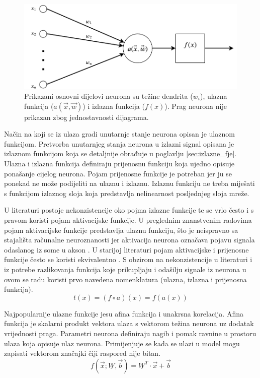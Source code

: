 \documentclass[times, utf8, numeric, diplomski]{fer}
\def\mat#1{\underline{#1}}
\begin{document}
\begin{figure}[h]
\centering
\includegraphics[scale=0.7]{Neuron.pdf}
\caption{Prikazani osnovni dijelovi neurona su težine dendrita ($w_i$), ulazna funkcija ($a(\vec{x},\vec{w})$) i izlazna funkcija ($f(x)$). Prag neurona nije prikazan zbog jednostavnosti dijagrama.}
\label{fig:neuron}
\end{figure}

Način na koji se iz ulaza gradi unutarnje stanje neurona opisan je ulaznom funkcijom. Pretvorba unutarnjeg stanja neurona u izlazni signal opisana je izlaznom funkcijom koja se detaljnije obrađuje u poglavlju \ref{sec:izlazne_fje}. Ulazna i izlazna funkcija definiraju prijenosnu funkciju koja ujedno opisuje ponašanje cijelog neurona. Pojam prijenosne funkcije je potreban jer ju se ponekad ne može podijeliti na ulaznu i izlaznu. Izlaznu funkciju ne treba miješati s funkcijom izlaznog sloja koja predstavlja nelinearnost posljednjeg sloja mreže.

U literaturi postoje nekonzistencije oko pojma izlazne funkcije te se vrlo često i s pravom koristi pojam aktivacijske funkcije. U preglednim znanstvenim radovima \citep{function_survey1, function_survey2, function_survey3} pojam aktivacijske funkcije predstavlja ulaznu funkciju, što je neispravno sa stajališta računalne neuroznanosti jer aktivacija neurona označava pojavu signala odaslanog iz some u akson \citep[p.~234]{neuroscience}. U starijoj literaturi pojam aktivacijske i prijenosne funkcije često se koristi ekvivalentno \citep{evolving_transfer}. S obzirom na nekonzistencije u literaturi i iz potrebe razlikovanja funkcija koje prikupljaju i odašilju signale iz neurona u ovom se radu koristi prvo navedena nomenklatura (ulazna, izlazna i prijenosna funkcija).
\begin{equation}
t(x) = (f \circ a)(x) = f(a(x))
\end{equation}

Najpopularnije ulazne funkcije jesu afina funkcija i unakrsna korelacija.
Afina funkcija je skalarni produkt vektora ulaza s vektorom težina neurona uz dodatak vrijednosti praga. Parametri neurona definiraju nagib i pomak ravnine u prostoru ulaza koja opisuje ulaz neurona. Primijenjuje se kada se ulazi u model mogu zapisati vektorom značajki čiji raspored nije bitan.
\begin{equation}
f(\vec{x};\mat{W},\vec{b})=\mat{W}^T \cdot \vec{x} + \vec{b}
\end{equation}
\end{document}
